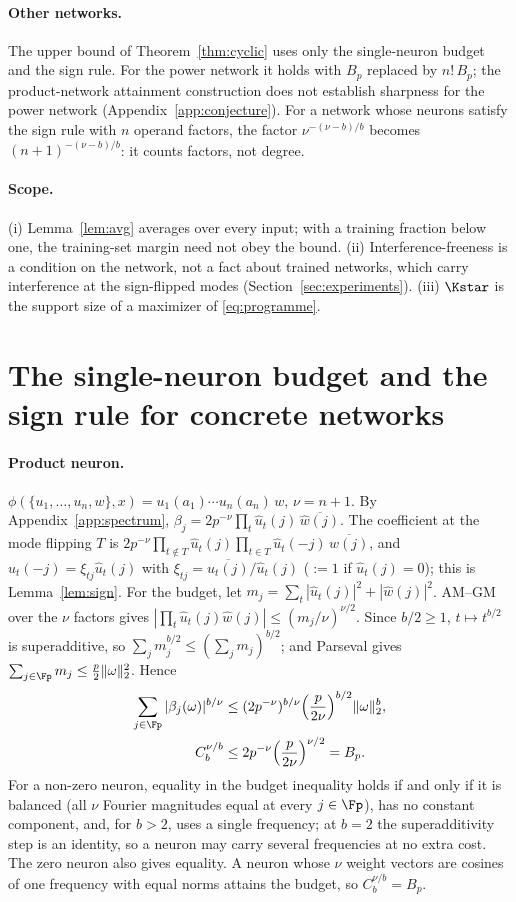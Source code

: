 \paragraph{Other networks.} The upper bound of Theorem~\ref{thm:cyclic} uses only the single-neuron budget and the sign rule. For the power network it holds with $B_p$ replaced by $n!\,B_p$; the product-network attainment construction does not establish sharpness for the power network (Appendix~\ref{app:conjecture}). For a network whose neurons satisfy the sign rule with $n$ operand factors, the factor $\nu^{-(\nu-b)/b}$ becomes $(n+1)^{-(\nu-b)/b}$: it counts factors, not degree.

\paragraph{Scope.} (i) Lemma~\ref{lem:avg} averages over every input; with a training fraction below one, the training-set margin need not obey the bound. (ii) Interference-freeness is a condition on the network, not a fact about trained networks, which carry interference at the sign-flipped modes (Section~\ref{sec:experiments}). (iii) $\Kstar$ is the support size of a maximizer of \eqref{eq:programme}.

\section{The single-neuron budget and the sign rule for concrete networks}\label{app:models}

\paragraph{Product neuron.} $\phi(\{u_1,\dots,u_n,w\},x)=u_1(a_1)\cdots u_n(a_n)\,w$, $\nu=n+1$. By Appendix~\ref{app:spectrum}, $\beta_j=2p^{-\nu}\prod_t\hat u_t(j)\,\overline{\hat w(j)}$. The coefficient at the mode flipping $T$ is $2p^{-\nu}\prod_{t\notin T}\hat u_t(j)\prod_{t\in T}\hat u_t(-j)\,\overline{\hat w(j)}$, and $\hat u_t(-j)=\xi_{tj}\hat u_t(j)$ with $\xi_{tj}=\overline{\hat u_t(j)}/\hat u_t(j)$ ($:=1$ if $\hat u_t(j)=0$); this is Lemma~\ref{lem:sign}. For the budget, let $m_j=\sum_t|\hat u_t(j)|^2+|\hat w(j)|^2$. AM--GM over the $\nu$ factors gives $|\prod_t\hat u_t(j)\hat w(j)|\le(m_j/\nu)^{\nu/2}$. Since $b/2\ge1$, $t\mapsto t^{b/2}$ is superadditive, so $\sum_jm_j^{b/2}\le(\sum_jm_j)^{b/2}$; and Parseval gives $\sum_{j\in\Fp}m_j\le\frac p2\|\omega\|_2^2$. Hence
\[
\begin{aligned}
\sum_{j\in\Fp}|\beta_j(\omega)|^{b/\nu}
&\le(2p^{-\nu})^{b/\nu}\Big(\frac p{2\nu}\Big)^{b/2}\|\omega\|_2^b,\\
C_b^{\nu/b}&\le2p^{-\nu}\Big(\frac p{2\nu}\Big)^{\nu/2}=B_p.
\end{aligned}
\]
For a non-zero neuron, equality in the budget inequality holds if and only if it is balanced (all $\nu$ Fourier magnitudes equal at every $j\in\Fp$), has no constant component, and, for $b>2$, uses a single frequency; at $b=2$ the superadditivity step is an identity, so a neuron may carry several frequencies at no extra cost. The zero neuron also gives equality. A neuron whose $\nu$ weight vectors are cosines of one frequency with equal norms attains the budget, so $C_b^{\nu/b}=B_p$.

